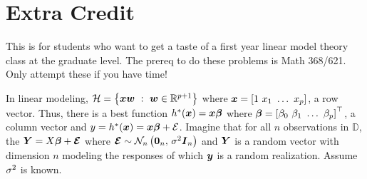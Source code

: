 \documentclass[12pt]{article}
\begin{document}
\begin{enumerate}


\end{enumerate}

\pagebreak

\section{Extra Credit} 
This is for students who want to get a taste of a first year linear model theory class at the graduate level. The prereq to do these problems is Math 368/621. Only attempt these if you have time!

In linear modeling, $\mathcal{H} = \left\{\boldsymbol{x} \boldsymbol{w}~:~\boldsymbol{w} \in \mathbb{R}^{p+1}\right\}$ where $\boldsymbol{x} = \left[1~x_1~\ldots~x_p\right]$, a row vector. Thus, there is a best function $h^*(\boldsymbol{x}) = \boldsymbol{x}\boldsymbol{\beta}$ where $\boldsymbol{\beta} = \left[\beta_0~\beta_1~\ldots~\beta_p\right]^\top$, a column vector and $y = h^*(\boldsymbol{x}) = \boldsymbol{x}\boldsymbol{\beta} + \mathcal{E}$. Imagine that for all $n$ observations in $\mathbb{D}$, the $\boldsymbol{Y} = X\boldsymbol{\beta} + \boldsymbol{\mathcal{E}}$ where $\boldsymbol{\mathcal{E}} \sim \mathcal{N}_{n}\left(\boldsymbol{0}_n,\,\sigma^2\boldsymbol{I}_n\right)$ and $\boldsymbol{Y}$ is a random vector with dimension $n$ modeling the responses of which $\boldsymbol{y}$ is a random realization. Assume $\sigma^2$ is known. 
\end{document}
